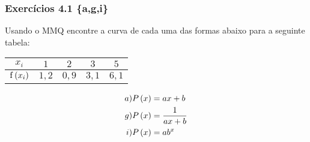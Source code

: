 \begin{frame}
\frametitle{Exercícios 4.1 \{a,g,i\} }
Usando o MMQ encontre a curva de cada uma das formas abaixo para a seguinte tabela:

\begin{tabular}{c|c|c|c|c}
$x_i$ & $1$ & $2$ & $3$ & $5$\\
\hline
$\mathrm{f} \left(x_i\right)$ & $1,2$ & $0,9$ & $3,1$ & $6,1$\\
\hline
\end{tabular}

\begin{align*}
a) & P\left(\x\right) = a \x + b\\
%
g) & P\left(\x\right) = \frac{1}{a \x + b}\\
%
i) & P\left(\x\right) = a b^\x
\end{align*}

\end{frame}

